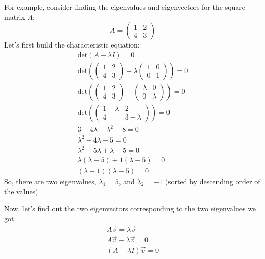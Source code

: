\documentclass[conference,final,11pt,technote,onecolumn]{IEEEtran}\usepackage[]{graphicx}\usepackage[]{color}
\begin{document}
For example, consider finding the eigenvalues and eigenvectors for the square matrix $A$:
\[ 
A = \begin{pmatrix}
1 & 2\\
4 & 3
\end{pmatrix}
\]
Let's first build the characteristic equation:
\begin{eqnarray}
\nonumber \text{det}(A-\lambda I) = 0\\
\nonumber \text{det}( \begin{pmatrix}
1 & 2\\
4 & 3
\end{pmatrix} - \lambda  \begin{pmatrix}
1 & 0\\
0 & 1
\end{pmatrix}) = 0\\
\nonumber \text{det}( \begin{pmatrix}
1 & 2\\
4 & 3
\end{pmatrix} - \begin{pmatrix}
\lambda & 0\\
0 & \lambda
\end{pmatrix}) = 0\\
\nonumber \text{det}( \begin{pmatrix}
1-\lambda & 2\\
4 & 3-\lambda
\end{pmatrix}) = 0\\
\nonumber 3-4\lambda + \lambda^2 - 8 = 0\\
\nonumber \lambda^2 -4\lambda -5 = 0\\
\nonumber \lambda^2-5\lambda+\lambda - 5 = 0\\
\nonumber \lambda(\lambda-5)+1(\lambda-5) = 0\\
\nonumber (\lambda+1)(\lambda-5) = 0
\end{eqnarray}
So, there are two eigenvalues, $\lambda_1 = 5$, and $\lambda_2 = -1$ (sorted by descending order of the values).

Now, let's find out the two eigenvectors corresponding to the two eigenvalues we got.
\begin{eqnarray}
\nonumber A\vec v = \lambda \vec v\\
\nonumber A\vec v - \lambda \vec v = 0\\
\label{eqn:eigenvalue1}(A - \lambda I)\vec v = 0\\
\end{eqnarray}
\end{document}

